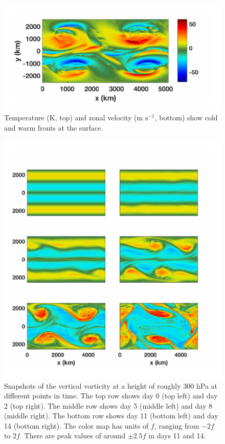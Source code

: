 \begin{figure}[H]
\vspace{-1em}
\includegraphics[scale=1]{Chapter3/img/squall}
\caption{Temperature (K, top) and zonal velocity (m $\text{s}^{-1}$, bottom) show cold and warm fronts at the surface.}
\label{fig:frontSquall}
\end{figure}
\vspace{-2em}
\begin{figure}[H]
\vspace{-3em}
\includegraphics[scale=1]{Chapter3/img/vortTimeSeries}
\caption{Snapshots of the vertical vorticity at a height of roughly 300 hPa at different points in time. The top row shows day 0 (top left) and day 2 (top right). The middle row shows day 5 (middle left) and day 8 (middle right). The bottom row shows day 11 (bottom left) and day 14 (bottom right). The color map has units of $f$, ranging from $-2f$ to $2f$. There are peak values of around $\pm 2.5f$ in days 11 and 14.}
\label{fig:vortTimeSeries}
\end{figure}


